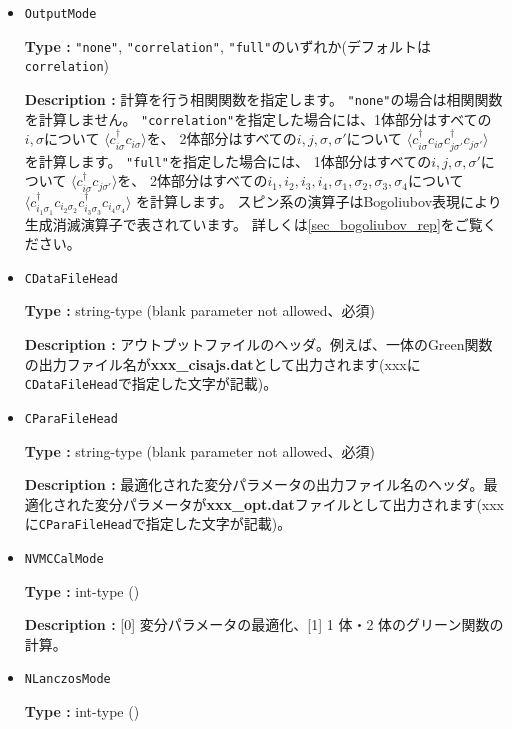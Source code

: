 \begin{itemize}

\item \verb|OutputMode|

  {\bf Type :} \verb|"none"|, \verb|"correlation"|, \verb|"full"|のいずれか(デフォルトは\verb|correlation|)

  {\bf Description :} 計算を行う相関関数を指定します。
\verb|"none"|の場合は相関関数を計算しません。
\verb|"correlation"|を指定した場合には、1体部分はすべての$i, \sigma$について
$\langle c_{i \sigma}^{\dagger}c_{i \sigma} \rangle$を、
2体部分はすべての$i, j, \sigma, \sigma'$について
$\langle c_{i \sigma}^{\dagger}c_{i \sigma} c_{j \sigma'}^{\dagger}c_{j \sigma'} \rangle$
を計算します。
\verb|"full"|を指定した場合には、
1体部分はすべての$i, j, \sigma, \sigma'$について
$\langle c_{i \sigma}^{\dagger}c_{j \sigma'} \rangle$を、
2体部分はすべての$i_1, i_2, i_3, i_4, \sigma_1, \sigma_2, \sigma_3, \sigma_4$について
$\langle c_{i_1 \sigma_1}^{\dagger}c_{i_2 \sigma_2} c_{i_3 \sigma_3}^{\dagger}c_{i_4 \sigma_4} \rangle$
を計算します。
スピン系の演算子はBogoliubov表現により生成消滅演算子で表されています。
詳しくは\ref{sec_bogoliubov_rep}をご覧ください。

  \item  \verb|CDataFileHead|

 {\bf Type :} string-type (blank parameter not allowed、必須)

{\bf Description :} アウトプットファイルのヘッダ。例えば、一体のGreen関数の出力ファイル名が{\bf xxx\_cisajs.dat}として出力されます(xxxに\verb|CDataFileHead|で指定した文字が記載)。

 \item  \verb|CParaFileHead|

 {\bf Type :} string-type (blank parameter not allowed、必須)

{\bf Description :} 最適化された変分パラメータの出力ファイル名のヘッダ。最適化された変分パラメータが{\bf xxx\_opt.dat}ファイルとして出力されます(xxxに\verb|CParaFileHead|で指定した文字が記載)。
 
 
 \item  \verb|NVMCCalMode|

 {\bf Type :} int-type ()

{\bf Description :} [0] 変分パラメータの最適化、[1] 1 体・2 体のグリーン関数の計算。
 
 \item  \verb|NLanczosMode|

 {\bf Type :} int-type ()


\end{itemize}
